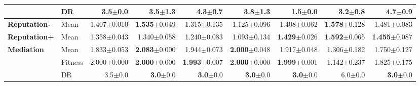 \begin{table}[htbp]
{\begin{tabular}{ll||r|rrrrrr}
 & DR & 3.5{\scriptsize\color{black!60}$\pm$0.0} & 3.5{\scriptsize\color{black!60}$\pm$1.3} & \textcolor{black!60}{4.3}{\scriptsize\color{black!60}$\pm$0.7} & 3.8{\scriptsize\color{black!60}$\pm$1.3} & \textbf{1.5}{\scriptsize\color{black!60}$\pm$0.0} & \textbf{3.2}{\scriptsize\color{black!60}$\pm$0.8} & \textcolor{black!60}{4.7}{\scriptsize\color{black!60}$\pm$0.9} \\
\midrule
\textbf{Reputation-} & Mean & \cellcolor[HTML]{E8F2F8} 1.407{\scriptsize\color{black!60}$\pm$0.010} & \textbf{1.535}{\scriptsize\color{black!60}$\pm$0.049} & \textcolor{black!60}{1.315}{\scriptsize\color{black!60}$\pm$0.135} & \textcolor{black!60}{1.125}{\scriptsize\color{black!60}$\pm$0.096} & 1.408{\scriptsize\color{black!60}$\pm$0.062} & \textbf{1.578}{\scriptsize\color{black!60}$\pm$0.128} & 1.481{\scriptsize\color{black!60}$\pm$0.083} \\
\midrule
\textbf{Reputation+} & Mean & \cellcolor[HTML]{DBEBF4} 1.358{\scriptsize\color{black!60}$\pm$0.043} & 1.340{\scriptsize\color{black!60}$\pm$0.058} & \textcolor{black!60}{1.240}{\scriptsize\color{black!60}$\pm$0.083} & \textcolor{black!60}{1.093}{\scriptsize\color{black!60}$\pm$0.134} & \textbf{1.429}{\scriptsize\color{black!60}$\pm$0.026} & \textbf{1.592}{\scriptsize\color{black!60}$\pm$0.065} & \textbf{1.455}{\scriptsize\color{black!60}$\pm$0.087} \\
\midrule
\multirow{3}{*}{\textbf{Mediation}} & Mean & \cellcolor[HTML]{F7DFAB} 1.833{\scriptsize\color{black!60}$\pm$0.053} & \textbf{2.083}{\scriptsize\color{black!60}$\pm$0.000} & 1.944{\scriptsize\color{black!60}$\pm$0.073} & \textbf{2.000}{\scriptsize\color{black!60}$\pm$0.048} & 1.917{\scriptsize\color{black!60}$\pm$0.048} & \textcolor{black!60}{1.306}{\scriptsize\color{black!60}$\pm$0.182} & \textcolor{black!60}{1.750}{\scriptsize\color{black!60}$\pm$0.127} \\
 & Fitness & \cellcolor[HTML]{F2CF80} 2.000{\scriptsize\color{black!60}$\pm$0.000} & \textbf{2.000}{\scriptsize\color{black!60}$\pm$0.000} & \textbf{1.993}{\scriptsize\color{black!60}$\pm$0.007} & \textbf{2.000}{\scriptsize\color{black!60}$\pm$0.000} & \textbf{1.999}{\scriptsize\color{black!60}$\pm$0.001} & \textcolor{black!60}{1.142}{\scriptsize\color{black!60}$\pm$0.237} & \textcolor{black!60}{1.825}{\scriptsize\color{black!60}$\pm$0.175} \\
 & DR & 3.5{\scriptsize\color{black!60}$\pm$0.0} & \textbf{3.0}{\scriptsize\color{black!60}$\pm$0.0} & \textbf{3.0}{\scriptsize\color{black!60}$\pm$0.0} & \textbf{3.0}{\scriptsize\color{black!60}$\pm$0.0} & \textbf{3.0}{\scriptsize\color{black!60}$\pm$0.0} & \textcolor{black!60}{6.0}{\scriptsize\color{black!60}$\pm$0.0} & \textbf{3.0}{\scriptsize\color{black!60}$\pm$0.0} \\

\end{tabular}}
\end{table}

